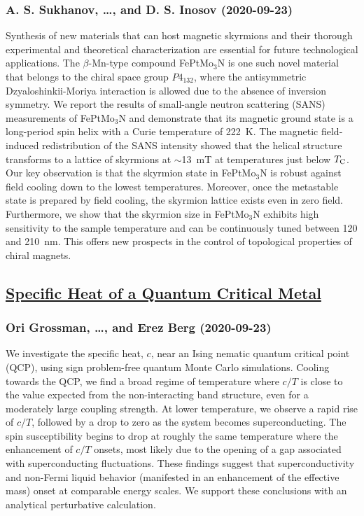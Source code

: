 \subsubsection*{A. S. Sukhanov, \dots, and D. S. Inosov (2020-09-23)}
Synthesis of new materials that can host magnetic skyrmions and their
thorough experimental and theoretical characterization are essential for future
technological applications. The $\beta$-Mn-type compound FePtMo$_3$N is one
such novel material that belongs to the chiral space group $P4_132$, where the
antisymmetric Dzyaloshinkii-Moriya interaction is allowed due to the absence of
inversion symmetry. We report the results of small-angle neutron scattering
(SANS) measurements of FePtMo$_3$N and demonstrate that its magnetic ground
state is a long-period spin helix with a Curie temperature of 222~K. The
magnetic field-induced redistribution of the SANS intensity showed that the
helical structure transforms to a lattice of skyrmions at $\sim$13~mT at
temperatures just below $T_{\text C}$. Our key observation is that the skyrmion
state in FePtMo$_3$N is robust against field cooling down to the lowest
temperatures. Moreover, once the metastable state is prepared by field cooling,
the skyrmion lattice exists even in zero field. Furthermore, we show that the
skyrmion size in FePtMo$_3$N exhibits high sensitivity to the sample
temperature and can be continuously tuned between 120 and 210~nm. This offers
new prospects in the control of topological properties of chiral magnets.

\subsection*{\href{http://arxiv.org/abs/2009.11280v1}{Specific Heat of a Quantum Critical Metal}}
\subsubsection*{Ori Grossman, \dots, and Erez Berg (2020-09-23)}
We investigate the specific heat, $c$, near an Ising nematic quantum critical
point (QCP), using sign problem-free quantum Monte Carlo simulations. Cooling
towards the QCP, we find a broad regime of temperature where $c/T$ is close to
the value expected from the non-interacting band structure, even for a
moderately large coupling strength. At lower temperature, we observe a rapid
rise of $c/T$, followed by a drop to zero as the system becomes
superconducting. The spin susceptibility begins to drop at roughly the same
temperature where the enhancement of $c/T$ onsets, most likely due to the
opening of a gap associated with superconducting fluctuations. These findings
suggest that superconductivity and non-Fermi liquid behavior (manifested in an
enhancement of the effective mass) onset at comparable energy scales. We
support these conclusions with an analytical perturbative calculation.

